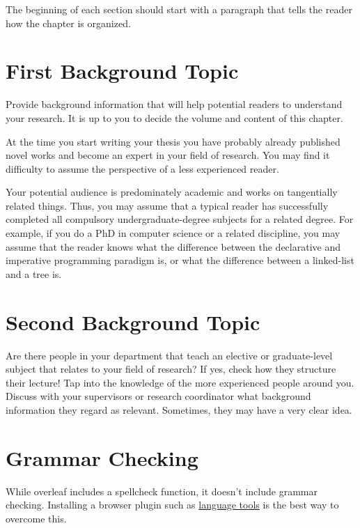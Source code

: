 

\noindent The beginning of each section should start with a paragraph that tells the reader how the chapter is organized.

\section{First Background Topic}
\label{s:First-Background-Topic}

Provide background information that will help potential readers to understand your research. It is up to you to decide the volume and content of this chapter.

At the time you start writing your thesis you have probably already published novel works and become an expert in your field of research. You may find it difficulty to assume the perspective of a less experienced reader.

Your potential audience is predominately academic and works on tangentially related things. Thus, you may assume that a typical reader has successfully completed all compulsory undergraduate-degree subjects for a related degree. For example, if you do a PhD in computer science or a related discipline, you may assume that the reader knows what the difference between the declarative and imperative programming paradigm is, or what the difference between a linked-list and a tree is.

\section{Second Background Topic}
\label{s:Second-Background-Topic}

Are there people in your department that teach an elective or graduate-level subject that relates to your field of research? If yes, check how they structure their lecture! Tap into the knowledge of the more experienced people around you. Discuss with your supervisors or research coordinator what background information they regard as relevant. Sometimes, they may have a very clear idea.

\section{Grammar Checking}
While overleaf includes a spellcheck function, it doesn't include grammar checking. Installing a browser plugin such as \href{https://www.overleaf.com/blog/635-languagetool-a-free-browser-add-on-to-check-your-grammar-and-spelling}{language tools}
 is the best way to overcome this. 
